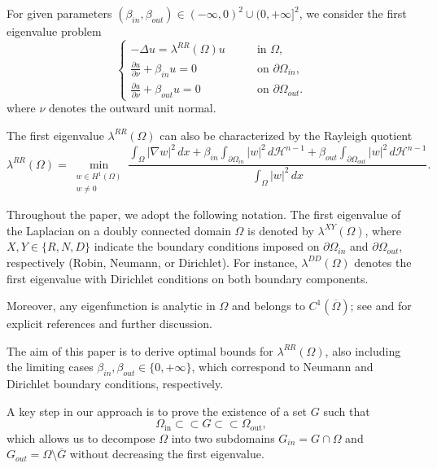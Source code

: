 \documentclass[oneside,a4paper,11pt,notitlepage]{article}
\newcommand{\betaposneg}{(-\infty,0)^2\cup(0, +\infty]^2}
\theoremstyle{plain}
\numberwithin{teor}{section}
\numberwithin{equation}{section}
\theoremstyle{definition}
\theoremstyle{plain}
\theoremstyle{plain}
\theoremstyle{plain}
\theoremstyle{plain}
\theoremstyle{definition}
\theoremstyle{definition}
\theoremstyle{plain}
\begin{document}
For given parameters $(\beta_{in}, \beta_{out}) \in \betaposneg$, we consider the first eigenvalue problem
\begin{equation}
    \label{probprinc}
    \begin{cases}
    -\Delta u = \lambda^{RR}(\Omega)u \qquad & \text{in } \Omega, \\
     \displaystyle \frac{\partial u }{\partial \nu} + \beta_{in} u = 0  \qquad & \text{on } \partial\Omega_{in},\\
    \displaystyle \frac{\partial u }{\partial \nu} + \beta_{out} u = 0  \qquad & \text{on } \partial\Omega_{out}.
\end{cases}
\end{equation}
where $\nu$ denotes the outward unit normal.

The first eigenvalue $\lambda^{RR}(\Omega)$ can also be characterized by the Rayleigh quotient
\begin{equation}
    \label{ray}
    \lambda^{RR}(\Omega) = \min_{\substack{w \in H^{1}(\Omega) \\ w \neq 0}} 
    \frac{\displaystyle \int_\Omega |\nabla w|^2\, dx 
    + \beta_{in} \int_{\partial\Omega_{in}} |w|^2\, d\mathcal{H}^{n-1}
    + \beta_{out} \int_{\partial\Omega_{out}} |w|^2\, d\mathcal{H}^{n-1}}
    {\displaystyle \int_\Omega |w|^2\, dx}.
\end{equation}

Throughout the paper, we adopt the following notation. The first eigenvalue of the Laplacian on a doubly connected domain $\Omega$ is denoted by $\lambda^{XY}(\Omega)$, where $X,Y \in \{R,N,D\}$ indicate the boundary conditions imposed on $\partial \Omega_{in}$ and $\partial \Omega_{out}$, respectively (Robin, Neumann, or Dirichlet). For instance, $\lambda^{DD}(\Omega)$ denotes the first eigenvalue with Dirichlet conditions on both boundary components.

Moreover, any eigenfunction is analytic in $\Omega$ and belongs to $C^{1}(\overline{\Omega})$; see \cite[Proposition~2.1]{asma} and \cite[Proposition~1.6]{lena} for explicit references and further discussion.

\medskip
The aim of this paper is to derive optimal bounds for $\lambda^{RR}(\Omega)$, also including the limiting cases $\beta_{in}, \beta_{out} \in \{0,+\infty\}$, which correspond to Neumann and Dirichlet boundary conditions, respectively.

A key step in our approach is to prove the existence of a set $G$ such that 
\[
\Omega_{\mathrm{in}} \subset\subset G \subset\subset \Omega_{\mathrm{out}},
\]
which allows us to decompose $\Omega$ into two subdomains $G_{in} = G \cap \Omega$ and $G_{out} = \Omega \setminus \overline{G}$ without decreasing the first eigenvalue.
\end{document}

